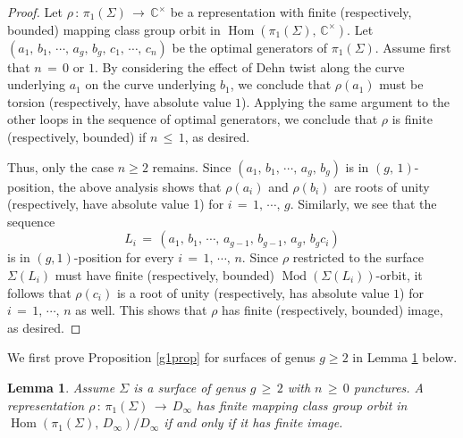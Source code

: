 \documentclass[reqno]{amsart}
\theoremstyle{plain}
\newtheorem{lemma}[theorem]{Lemma}
\theoremstyle{definition}
\theoremstyle{remark}
\newcommand{\C}{{\mathbb{C}}}
\DeclareMathOperator{\Hom}{Hom}
\DeclareMathOperator{\Mod}{Mod}
\begin{document}
\begin{proof}
Let $\rho\,:\,\pi_1(\Sigma)\,\to\,\C^\times$ be a representation with finite (respectively, bounded) mapping class
group orbit in
$\Hom(\pi_1(\Sigma),\,\C^\times)$. Let $(a_1,\,b_1,\,\cdots,\,a_g,\,b_g,\,c_1,\,\cdots,\,c_n)$ be the optimal
generators of $\pi_1(\Sigma)$. Assume first that $n\,=\,0$ or $1$. By considering the effect of Dehn twist
along the curve underlying $a_1$ on the curve underlying $b_1$, we conclude that $\rho(a_1)$ must be
torsion (respectively, have absolute value $1$). Applying the same argument to the other loops in the sequence
of optimal generators, we conclude that $\rho$ is finite (respectively, bounded) if $n\,\leq\,1$, as desired.

Thus, only the case $n\geq2$ remains. Since $(a_1,\,b_1,\,\cdots,\,a_g,\,b_g)$ is in $(g,\,1)$-position,
the above analysis shows that $\rho(a_i)$ and $\rho(b_i)$ are roots of unity (respectively, have absolute
value 1) for $i\,=\,1,\,\cdots,\,g$. Similarly, we see that the sequence
$$L_i\,=\,(a_1,\,b_1,\,\cdots,\,a_{g-1},\,b_{g-1},\,a_g,\,b_gc_i)$$
is in $(g,1)$-position for every $i\,=\,1,\,\cdots,\,n$. Since $\rho$ restricted to the surface $\Sigma(L_i)$ must
have finite (respectively, bounded) $\Mod(\Sigma(L_i))$-orbit,
it follows that $\rho(c_i)$ is a root of unity (respectively, has absolute value $1$) for $i\,=\,1,\,\cdots,\,n$
as well. This shows that $\rho$ has finite (respectively, bounded) image, as desired.
\end{proof}

We first prove Proposition \ref{g1prop} for surfaces of genus $g\geq2$ in Lemma \ref{dilem2} below.

\begin{lemma}
\label{dilem2}
Assume $\Sigma$ is a surface of genus $g\,\geq\,2$ with $n\,\geq\,0$ punctures. A representation $\rho\,:\,
\pi_1(\Sigma)\,\to\, D_\infty$ has finite mapping class group orbit in $\Hom(\pi_1(\Sigma),\,D_\infty)/D_\infty$
if and only if it has finite image.
\end{lemma}
\end{document}
